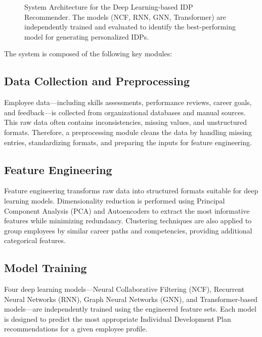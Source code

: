 \begin{figure}[H]
    \caption{System Architecture for the Deep Learning-based IDP Recommender. The models (NCF, RNN, GNN, Transformer) are independently trained and evaluated to identify the best-performing model for generating personalized IDPs.}
    \label{fig:idp_system_architecture}
\end{figure}


The system is composed of the following key modules:

\subsection{Data Collection and Preprocessing}
Employee data—including skills assessments, performance reviews, career goals, and feedback—is collected from organizational databases and manual sources. This raw data often contains inconsistencies, missing values, and unstructured formats. Therefore, a preprocessing module cleans the data by handling missing entries, standardizing formats, and preparing the inputs for feature engineering.

\subsection{Feature Engineering}
Feature engineering transforms raw data into structured formats suitable for deep learning models. Dimensionality reduction is performed using Principal Component Analysis (PCA) and Autoencoders to extract the most informative features while minimizing redundancy. Clustering techniques are also applied to group employees by similar career paths and competencies, providing additional categorical features.

\subsection{Model Training}
Four deep learning models—Neural Collaborative Filtering (NCF), Recurrent Neural Networks (RNN), Graph Neural Networks (GNN), and Transformer-based models—are independently trained using the engineered feature sets. Each model is designed to predict the most appropriate Individual Development Plan recommendations for a given employee profile.

